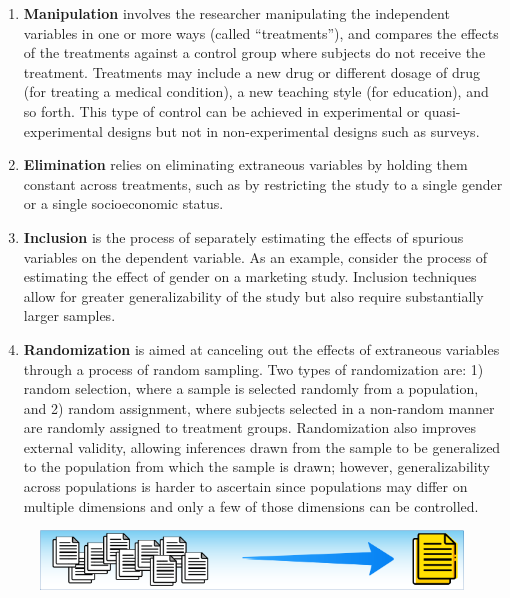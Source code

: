 \begin{enumerate}
	\item \textbf{Manipulation} involves the researcher manipulating the independent variables in one or more ways (called ``treatments''), and compares the effects of the treatments against a control group where subjects do not receive the treatment. Treatments may include a new drug or different dosage of drug (for treating a medical condition), a new teaching style (for education), and so forth. This type of control can be achieved in experimental or quasi-experimental designs but not in non-experimental designs such as surveys. 
	
	\item \textbf{Elimination} relies on eliminating extraneous variables by holding them constant across treatments, such as by restricting the study to a single gender or a single socioeconomic status. 
	
	\item \textbf{Inclusion} is the process of separately estimating the effects of spurious variables on the dependent variable. As an example, consider the process of estimating the effect of gender on a marketing study. Inclusion techniques allow for greater generalizability of the study but also require substantially larger samples. 
	
	\item \textbf{Randomization} is aimed at canceling out the effects of extraneous variables through a process of random sampling. Two types of randomization are: 1) random selection, where a sample is selected randomly from a population, and 2) random assignment, where subjects selected in a non-random manner are randomly assigned to treatment groups. Randomization also improves external validity, allowing inferences drawn from the sample to be generalized to the population from which the sample is drawn; however, generalizability across populations is harder to ascertain since populations may differ on multiple dimensions and only a few of those dimensions can be controlled.
	
\end{enumerate}

\begin{figure}[H]
	\centering
	\includegraphics[width=\maxwidth{.95\linewidth}]{gfx/Sampling_Of_Research}
	\caption*{}
	\label{05:sampling_of_research}
\end{figure}
